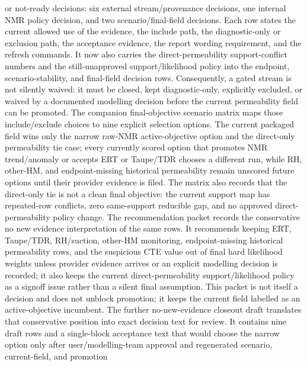 or not-ready decisions: six external stream/provenance decisions, one internal NMR
policy decision, and two scenario/final-field decisions.  Each row states the
current allowed use of the evidence, the include path, the diagnostic-only or
exclusion path, the acceptance evidence, the report wording requirement, and the
refresh commands.  It now also carries the direct-permeability support-conflict
numbers and the still-unapproved support/likelihood policy into the endpoint,
scenario-stability, and final-field decision rows.  Consequently, a gated stream is
not silently waived: it must be
closed, kept diagnostic-only, explicitly excluded, or waived by a documented
modelling decision before the current permeability field can be promoted.
The companion final-objective scenario matrix
 maps those
include/exclude choices to nine explicit selection options.  The current packaged
field wins only the narrow raw-NMR active-objective option and the direct-only
permeability tie case; every currently scored option that promotes NMR trend/anomaly
or accepts ERT or Taupe/TDR chooses a different run, while RH, other-HM, and
endpoint-missing historical permeability remain unscored future options until their
provider evidence is filed.  The matrix also records that the direct-only tie is
not a clean final objective: the current support map has repeated-row conflicts,
zero same-support reducible gap, and no approved direct-permeability policy change.
The recommendation packet
records the conservative no new evidence interpretation of the same rows.  It
recommends keeping ERT, Taupe/TDR, RH/suction, other-HM monitoring,
endpoint-missing historical permeability rows, and the suspicious CTE value out of
final hard likelihood weights unless provider evidence arrives or an explicit
modelling decision is recorded; it also keeps the current direct-permeability
support/likelihood policy as a signoff issue rather than a silent final assumption.
This packet is not itself a decision and does not
unblock promotion; it keeps the current field labelled as an active-objective
incumbent.
The further no-new-evidence closeout draft
translates that conservative position into exact decision text for review.  It
contains nine draft rows and a single-block acceptance text that would choose the
narrow  option only after
user/modelling-team approval and regenerated scenario, current-field, and promotion

